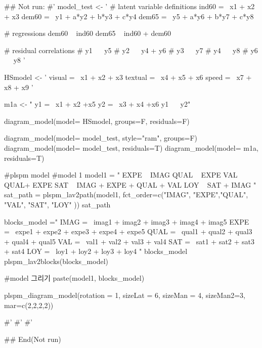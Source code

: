 \documentclass[a4paper]{book}
\begin{document}
\begin{Examples}
\begin{ExampleCode}
\#\# Not run: 
#'
model_test <- '
  # latent variable definitions
     ind60 =~ x1 + x2 + x3
     dem60 =~ y1 + a*y2 + b*y3 + c*y4
     dem65 =~ y5 + a*y6 + b*y7 + c*y8

  # regressions
    dem60 ~ ind60
    dem65 ~ ind60 + dem60

  # residual correlations
    # y1 ~~ y5
    # y2 ~~ y4 + y6
    # y3 ~~ y7
    # y4 ~~ y8
    # y6 ~~ y8
'

HSmodel <- ' visual  =~ x1 + x2 + x3
             textual =~ x4 + x5 + x6
             speed   =~ x7 + x8 + x9 '


m1a <- "
y1 =~ x1 + x2 +x5
y2 =~ x3 + x4 +x6
y1 ~~ y2"

diagram_model(model= HSmodel, groups=F,  residuals=F)

diagram_model(model= model_test, style="ram", groups=F)
diagram_model(model= model_test, residuals=T)
diagram_model(model= m1a, residuals=T)


#plspm model
#model 1
model1 = "
EXPE ~ IMAG
QUAL ~ EXPE
VAL ~  QUAL+ EXPE
SAT ~ IMAG + EXPE + QUAL + VAL
LOY ~ SAT + IMAG
"
sat_path = plspm_lav2path(model1,
                          fct_order=c("IMAG", "EXPE","QUAL", "VAL", "SAT", "LOY" ))
sat_path

blocks_model ="
IMAG =~ imag1 + imag2 + imag3 + imag4 + imag5
EXPE =~ expe1 + expe2 + expe3 + expe4 + expe5
QUAL =~ qual1 + qual2 + qual3 + qual4 + qual5
VAL =~ val1 + val2 + val3 + val4
SAT =~ sat1 + sat2 + sat3 + sat4
LOY =~ loy1 + loy2 + loy3 + loy4
"
blocks_model
plspm_lav2blocks(blocks_model)

#model 그리기
paste(model1, blocks_model)%

  plspm_diagram_model(rotation = 1, sizeLat = 6, sizeMan = 4, sizeMan2=3,
                mar=c(2,2,2,2))

#'
#'
#'

## End(Not run)
\end{ExampleCode}
\end{Examples}
\end{document}
